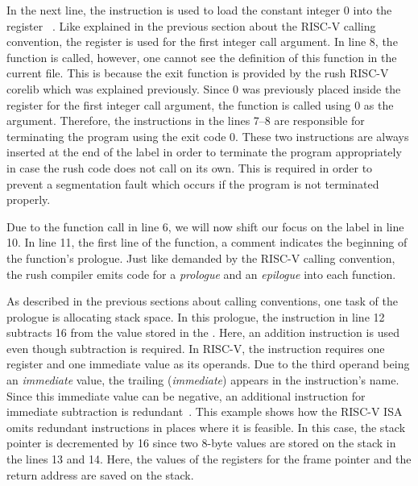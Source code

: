 In the next line, the  instruction is used to load the constant integer 0 into the register ~\cite[reference]{Patterson2017}.
Like explained in the previous section about the RISC-V calling convention,
the register  is used for the first integer call argument.
In line 8, the  function is called, however, one cannot see the definition of this function in the current file.
This is because the exit function is provided by the rush RISC-V corelib which was explained previously.
Since 0 was previously placed inside the register for the first integer call argument, the  function is called using 0 as the argument.
Therefore, the instructions in the lines 7--8 are responsible for terminating the program using the exit code 0.
These two instructions are always inserted at the end of the  label in order to terminate the program appropriately in case the rush code does not call  on its own.
This is required in order to prevent a segmentation fault which occurs if the program is not terminated properly.

Due to the function call in line 6, we will now shift our focus on the  label in line 10.
In line 11, the first line of the  function, a comment indicates the beginning of the function's prologue.
Just like demanded by the RISC-V calling convention, the rush compiler emits code for a \emph{prologue} and an \emph{epilogue} into each function.

As described in the previous sections about calling conventions, one task of the prologue is allocating stack space.
In this prologue, the  instruction in line 12 subtracts 16 from the value stored in the .
Here, an addition instruction is used even though subtraction is required.
In RISC-V, the  instruction requires one register and one immediate value as its operands.
Due to the third operand being an \emph{immediate} value, the trailing  (\emph{immediate}) appears in the instruction's name.
Since this immediate value can be negative, an additional instruction for immediate subtraction is redundant~\cite[reference]{Patterson2017}.
This example shows how the RISC-V ISA omits redundant instructions in places where it is feasible.
In this case, the stack pointer is decremented by 16 since two 8-byte values are stored on the stack in the lines 13 and 14.
Here, the values of the registers for the frame pointer and the return address are saved on the stack.

